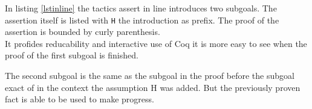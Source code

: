 In listing \ref{lstinline} the tactics assert in line introduces two subgoals. 
The assertion itself is listed with \lstinline!H! the introduction as prefix.
The proof of the assertion is bounded by curly parenthesis.\\
It profides reducability and interactive use of Coq it is more easy to see when the proof of the first subgoal is finished.

The second subgoal is the same as the subgoal in the proof before the subgoal exact of in the context the assumption H was added.
But the previously proven fact is able to be used to make progress.
 





